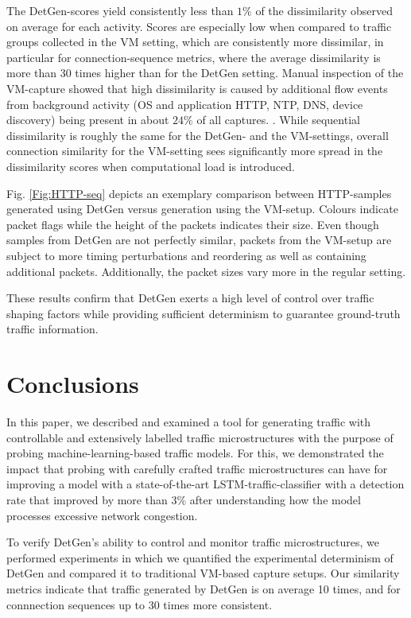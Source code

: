 \documentclass[runningheads]{llncs}
\begin{document}
The DetGen-scores yield consistently less than $1\%$ of the dissimilarity observed on average for each activity. Scores are especially low when compared to traffic groups collected in the VM setting, which are consistently more dissimilar, in particular for connection-sequence metrics, where the average dissimilarity is more than 30 times higher than for the DetGen setting. Manual inspection of the VM-capture showed that high dissimilarity is caused by additional flow events from background activity (OS and application HTTP, NTP, DNS, device discovery) being present in about $24\%$ of all captures.
. While sequential dissimilarity is roughly the same for the DetGen- and the VM-settings, overall connection similarity for the VM-setting sees significantly more spread in the dissimilarity scores when computational load is introduced.

Fig. \ref{Fig:HTTP-seq} depicts an exemplary comparison between HTTP-samples generated using DetGen versus generation using the VM-setup. Colours indicate packet flags while the height of the packets indicates their size. Even though samples from DetGen are not perfectly similar, packets from the VM-setup are subject to more timing perturbations and reordering as well as containing additional packets. Additionally, the packet sizes vary more in the regular setting.

These results confirm that DetGen exerts a high level of control over traffic shaping factors while providing sufficient determinism to guarantee ground-truth traffic information.


\section{Conclusions}\label{Sec:Conclusion}

In this paper, we described and examined a tool for generating traffic with controllable and extensively labelled traffic microstructures with the purpose of probing machine-learning-based traffic models. For this, we demonstrated the impact that probing with carefully crafted traffic microstructures can have for improving a model with a state-of-the-art LSTM-traffic-classifier with a detection rate that improved by more than 3\% after understanding how the model processes excessive network congestion. 

To verify DetGen's ability to control and monitor traffic microstructures, we performed experiments in which we quantified the experimental determinism of DetGen and compared it to traditional VM-based capture setups. Our similarity metrics indicate that traffic generated by DetGen is on average 10 times, and for connnection sequences up to 30 times more consistent.
\end{document}
